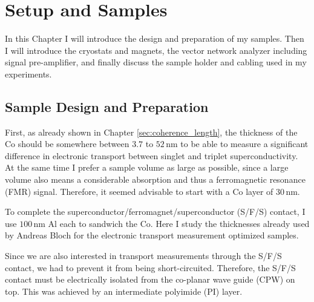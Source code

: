 \chapter{Setup and Samples}
In this Chapter I will introduce the design and preparation of my samples. Then I will introduce the cryostats and magnets, the vector network analyzer including signal pre-amplifier, and finally discuss the sample holder and cabling used in my experiments.

\section{Sample Design and Preparation} \label{sec:sample_design} 
First, as already shown in Chapter \ref{sec:coherence_length}, the thickness of the Co should be somewhere between $3.7$ to $52\,$nm to be able to measure a significant difference in electronic transport between singlet and triplet superconductivity. At the same time I prefer a sample volume as large as possible, since a large volume also means a considerable absorption and thus a ferromagnetic resonance (FMR) signal. Therefore, it seemed advisable to start with a Co layer of $30\,$nm.

To complete the superconductor/ferromagnet/superconductor (S/F/S) contact, I use $100\,$nm Al each to sandwich the Co. Here I study the thicknesses already used by Andreas Bloch for the electronic transport measurement optimized samples.

Since we are also interested in transport measurements through the S/F/S contact, we had to prevent it from being short-circuited. Therefore, the S/F/S contact must be electrically isolated from the co-planar wave guide (CPW) on top. This was achieved by an intermediate polyimide (PI) layer.

